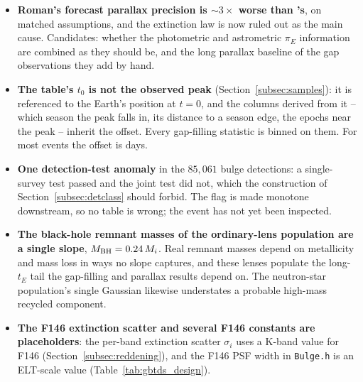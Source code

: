 \documentclass[english,10pt,a4paper]{article}
\begin{document}
\begin{itemize}
		\item \textbf{Roman's forecast parallax precision is $\sim\!3\times$ worse than \cite{SajadianSahu2023}'s}, on matched assumptions, and the extinction law is now ruled out as the main cause. Candidates: whether the photometric and astrometric $\pi_E$ information are combined as they should be, and the long parallax baseline of the gap observations they add by hand.

		\item \textbf{The table's $t_0$ is not the observed peak} (Section~\ref{subsec:samples}): it is referenced to the Earth's position at $t=0$, and the columns derived from it -- which season the peak falls in, its distance to a season edge, the epochs near the peak -- inherit the offset. Every gap-filling statistic is binned on them. For most events the offset is days.

		\item \textbf{One detection-test anomaly} in the $85{,}061$ bulge detections: a single-survey test passed and the joint test did not, which the construction of Section~\ref{subsec:detclass} should forbid. The flag is made monotone downstream, so no table is wrong; the event has not yet been inspected.

		\item \textbf{The black-hole remnant masses of the ordinary-lens population are a single slope}, $M_{\rm BH} = 0.24\,M_i$. Real remnant masses depend on metallicity and mass loss in ways no slope captures, and these lenses populate the long-$t_E$ tail the gap-filling and parallax results depend on. The neutron-star population's single Gaussian likewise understates a probable high-mass recycled component.

		\item \textbf{The F146 extinction scatter and several F146 constants are placeholders}: the per-band extinction scatter $\sigma_i$ uses a K-band value for F146 (Section~\ref{subsec:reddening}), and the F146 PSF width in \texttt{Bulge.h} is an ELT-scale value (Table~\ref{tab:gbtds_design}).

\end{itemize}

	
	
	
	
\end{document}
